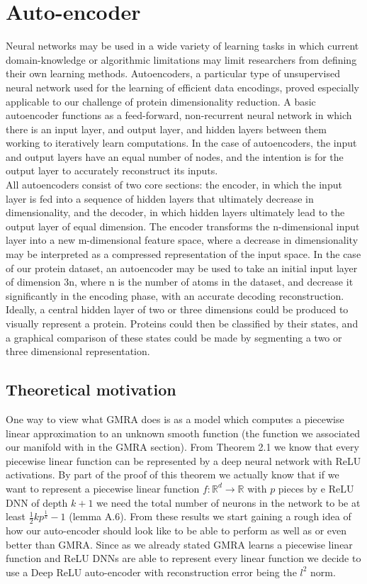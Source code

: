 \documentclass{article}
\begin{document}
\section{Auto-encoder}
Neural networks may be used in a wide variety of learning tasks in which current domain-knowledge or algorithmic limitations may limit researchers from defining their own learning methods. Autoencoders, a particular type of unsupervised neural network used for the learning of efficient data encodings, proved especially applicable to our challenge of protein dimensionality reduction. A basic autoencoder functions as a feed-forward, non-recurrent neural network in which there is an input layer, and output layer, and hidden layers between them working to iteratively learn computations. In the case of autoencoders, the input and output layers have an equal number of nodes, and the intention is for the output layer to accurately reconstruct its inputs. \\
All autoencoders consist of two core sections: the encoder, in which the input layer is fed into a sequence of hidden layers that ultimately decrease in dimensionality, and the decoder, in which hidden layers ultimately lead to the output layer of equal dimension. The encoder transforms the n-dimensional input layer into a new m-dimensional feature space, where a decrease in dimensionality may be interpreted as a compressed representation of the input space. In the case of our protein dataset, an autoencoder may be used to take an initial input layer of dimension 3n, where n is the number of atoms in the dataset, and decrease it significantly in the encoding phase, with an accurate decoding reconstruction. Ideally, a central hidden layer of two or three dimensions could be produced to visually represent a protein. Proteins could then be classified by their states, and a graphical comparison of these states could be made by segmenting a two or three dimensional representation.

\subsection{Theoretical motivation}
One way to view what GMRA does is as a model which computes a piecewise linear approximation to an unknown smooth function (the function we associated our manifold with in the GMRA section). From \cite{arora2016understanding} Theorem 2.1 we know that every piecewise linear function can be represented by a deep neural network with ReLU activations. By part of the proof of this theorem we actually know that if we want to represent a piecewise linear function $f:\mathbb{R}^d \rightarrow \mathbb{R}$ with $p$ pieces by e ReLU DNN of depth $k+1$ we need the total number of neurons in the network to be at least $\frac{1}{2}kp^{\frac{1}{k}}-1$ (lemma A.6). From these results we start gaining a rough idea of how our auto-encoder should look like to be able to perform as well as or even better than GMRA. Since as we already stated GMRA learns a piecewise linear function and ReLU DNNs are able to represent every linear function we decide to use a Deep ReLU auto-encoder with reconstruction error being the $l^2$ norm.
\end{document}
